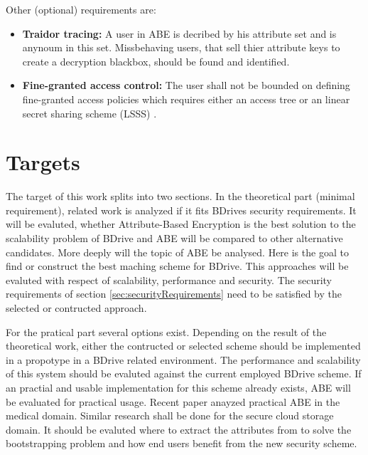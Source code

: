 \documentclass[twocolumn]{article}
\begin{document}
\noindent Other (optional) requirements are: 
\begin{itemize}
	\item \textbf{Traidor tracing:} A user in ABE is decribed by his attribute set and is anynoum in this set. Missbehaving users, that sell thier attribute keys to create a decryption blackbox, should be found and identified. \cite{liu2016practical}
	\item \textbf{Fine-granted access control:} The user shall not be bounded on defining fine-granted access policies which requires either an access tree \cite{bethencourt2007ciphertext} \cite{yang2013dac} \cite{wu2017security} \cite{li2013matrix} or an linear secret sharing scheme (LSSS) \cite{liu2016practical}.
\end{itemize}

\section{Targets}
The target of this work splits into two sections. In the theoretical part (minimal requirement), related work is analyzed if it fits BDrives security requirements. It will be evaluted, whether Attribute-Based Encryption is the best solution to the scalability problem of BDrive and ABE will be compared to other alternative candidates. More deeply will the topic of ABE be analysed. Here is the goal to find or construct the best maching scheme for BDrive. This approaches will be evaluted with respect of scalability, performance and security. The security requirements of section \ref{sec:securityRequirements} need to be satisfied by the selected or contructed approach.

For the pratical part several options exist. Depending on the result of the theoretical work, either the contructed or selected scheme should be implemented in a propotype in a BDrive related environment. The performance and scalability of this system should be evaluted against the current employed BDrive scheme. If an practial and usable implementation for this scheme already exists, ABE will be evaluated for practical usage. Recent paper anayzed practical ABE in the medical domain. \cite{thatmann2016please} \cite{li2013scalable} \cite{akinyele2011securing} Similar research shall be done for the secure cloud storage domain. It should be evaluted where to extract the attributes from to solve the bootstrapping problem and how end users benefit from the new security scheme.
\end{document}
